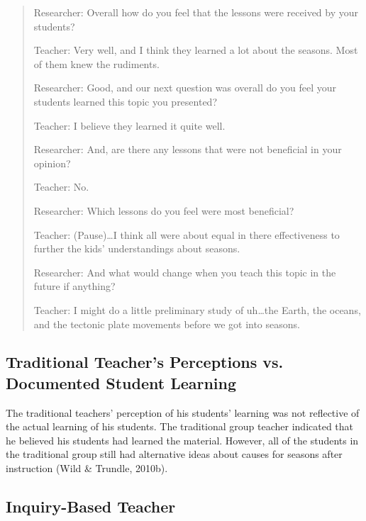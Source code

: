 \documentclass[11.5pt]{sig-alternate} %
\begin{document}
\begin{large}
\begin{quote}
Researcher: Overall how do you feel that the lessons were received by your students?

Teacher: Very well, and I think they learned a lot about the seasons.  Most of them knew the rudiments.

Researcher:  Good, and our next question was overall do you feel your students learned this topic you presented?

Teacher:  I believe they learned it quite well.

Researcher:  And, are there any lessons that were not beneficial in your opinion?

Teacher:  No.  

Researcher:  Which lessons do you feel were most beneficial?  

Teacher: (Pause)…I think all were about equal in there effectiveness to further the kids’  understandings about seasons. 

Researcher: And what would change when you teach this topic in the future if anything?

Teacher:  I might do a little preliminary study of uh…the Earth, the oceans, and the tectonic plate movements before we got into seasons.
\end{quote}

\subsection*{Traditional Teacher’s Perceptions vs. Document\-ed Student Learning}

The traditional teachers’ perception of his students’ learning was not reflective of the actual learning of his students. The traditional group teacher indicated that he believed his students had learned the material. However, all of the students in the traditional group still had alternative ideas about causes for seasons after instruction (Wild \& Trundle, 2010b).    

\subsection*{Inquiry-Based Teacher}


\end{large}
\end{document}
